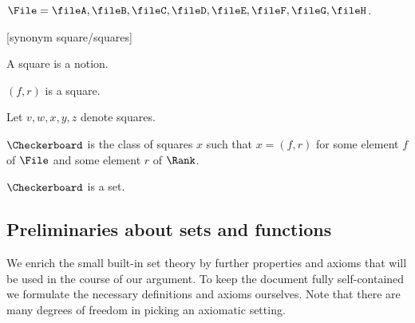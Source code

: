 \begin{forthel}
    \begin{definition}
        $\File = {\fileA,\fileB,\fileC,\fileD,\fileE,\fileF,\fileG,\fileH}$.
    \end{definition}

    [synonym square/squares]
    \begin{signature} A square is a notion. \end{signature}
    \begin{axiom} $(f, r)$ is a square. \end{axiom}
    Let $v, w, x, y, z$ denote squares.

    \begin{definition}
        $\Checkerboard$ is the class of squares $x$ such that $x = (f, r)$ for some
        element $f$ of $\File$ and some element $r$ of $\Rank$.
    \end{definition}

    \begin{axiom} $\Checkerboard$ is a set. \end{axiom}
\end{forthel}


\subsection{Preliminaries about sets and functions}

We enrich the small built-in set theory by further properties and axioms that
will be used in the course of our argument. To keep the document fully
self-contained we formulate the necessary definitions and axioms ourselves.
Note that there are many degrees of freedom in picking an axiomatic setting.

